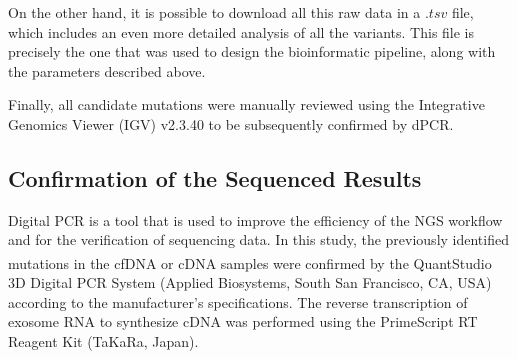 On the other hand, it is possible to download all this raw data in a $.tsv$ file, which includes an even more detailed analysis of all the variants. This file is precisely the one that was used to design the bioinformatic pipeline, along with the parameters described above.

Finally, all candidate mutations were manually reviewed using the Integrative Genomics Viewer (IGV) v2.3.40 to be subsequently confirmed by dPCR.

\subsection{Confirmation of the Sequenced Results}

Digital PCR is a tool that is used to improve the efficiency of the NGS workflow and for the verification of sequencing data. In this study, the previously identified mutations in the cfDNA or cDNA samples were confirmed by the QuantStudio\textsuperscript\textregistered{} 3D Digital PCR System (Applied Biosystems, South San Francisco, CA, USA) according to the manufacturer's specifications. The reverse transcription of exosome RNA to synthesize cDNA was performed using the PrimeScript\texttrademark{} RT Reagent Kit (TaKaRa, Japan).

